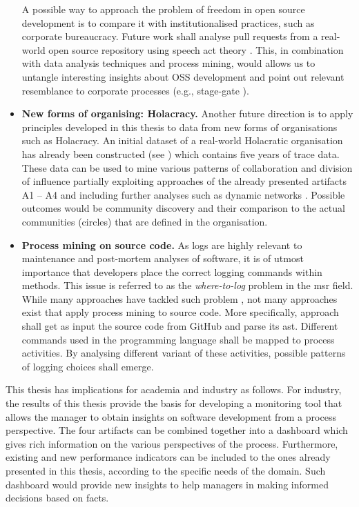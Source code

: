 \begin{itemize}
	A possible way to approach the problem of freedom in open source development is to compare it with institutionalised practices, such as corporate bureaucracy. Future work shall analyse pull requests from a real-world open source repository using speech act theory \citep{searle1985expression}. This, in combination with data analysis techniques and process mining, would allows us to untangle interesting insights about OSS development and point out relevant resemblance to corporate processes (e.g., stage-gate  \citep{cooper2008perspective}). 
	
	
	\item{\bfseries New forms of organising: Holacracy.}
	Another future direction is to apply principles developed in this thesis to data from new forms of organisations  such as Holacracy. An initial dataset of a real-world Holacratic organisation has already been constructed (see \citep{Wurm2021}) which contains five years of trace data. These data can be used to mine various patterns of collaboration and division of influence partially exploiting approaches of the already presented artifacts A1 – A4 and including further analyses such as dynamic networks \citep{DBLP:journals/csur/RossettiC18,DBLP:journals/corr/abs-0803-2093}. Possible outcomes would be community discovery and their comparison to the actual communities (circles) that are defined in the organisation.
	
	\item{\bfseries Process mining on source code.}
	As logs are highly relevant to maintenance and post-mortem analyses of software, it is of utmost importance that developers place the correct logging commands within methods. This issue is referred to as the  \emph{where-to-log} problem in the \gls{msr} field.  While many approaches have tackled such problem \citep{DBLP:conf/icse/FuZHLDLZX14,DBLP:conf/icse/ChenJ17,DBLP:conf/msr/CandidoHAD21}, not many approaches exist that apply process mining to source code. More specifically, approach shall get as input the source code from GitHub and parse its \gls{ast}. Different commands used in the programming language shall be mapped to process activities. By analysing different variant of these activities, possible patterns of logging choices shall emerge. 
	
	
\end{itemize}

This thesis has implications for academia and industry as follows. 
For industry, the results of this thesis provide the basis for developing a monitoring tool that allows the manager to obtain insights on software development from a process perspective. The four artifacts can be combined together into a dashboard which gives rich information on the various perspectives of the process. Furthermore, existing and new performance indicators can be included to the ones already presented in this thesis, according to the specific needs of the domain. Such dashboard would provide new insights to help managers in making informed decisions based on facts. 


